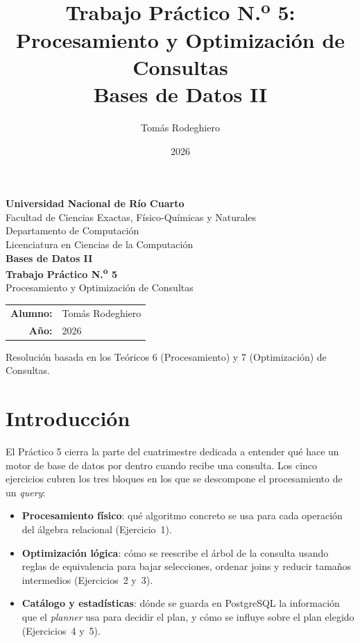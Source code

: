 \documentclass[11pt,a4paper]{article}
\title{Trabajo Práctico N.\textsuperscript{o} 5:
       Procesamiento y Optimización de Consultas\\[4pt]
       \large Bases de Datos II}
\author{Tomás Rodeghiero}
\date{2026}
\begin{document}
\begin{titlepage}
    \centering
    \vspace*{1.5cm}

    {\large \textbf{Universidad Nacional de Río Cuarto}}\\[6pt]
    {\normalsize Facultad de Ciencias Exactas, Físico-Químicas y Naturales}\\[4pt]
    {\normalsize Departamento de Computación}\\[4pt]
    {\normalsize Licenciatura en Ciencias de la Computación}\\[3cm]

    {\Large \textbf{Bases de Datos II}}\\[1.2cm]

    {\Large \textbf{Trabajo Práctico N.\textsuperscript{o} 5}}\\[6pt]
    {\large Procesamiento y Optimización de Consultas}\\[3cm]

    \begin{tabular}{rl}
        \textbf{Alumno:} & Tomás Rodeghiero \\[4pt]
        \textbf{Año:}    & 2026 \\
    \end{tabular}

    \vfill
    {\small Resolución basada en los Teóricos 6 (Procesamiento) y 7 (Optimización)
    de Consultas.}
\end{titlepage}

\tableofcontents
\newpage

\section{Introducción}

El Práctico 5 cierra la parte del cuatrimestre dedicada a entender qué hace un motor de base de datos por dentro cuando recibe una consulta. Los cinco ejercicios cubren los tres bloques en los que se descompone el procesamiento de un \emph{query}:

\begin{itemize}
    \item \textbf{Procesamiento físico}: qué algoritmo concreto se usa para cada operación del álgebra relacional (Ejercicio~1).
    \item \textbf{Optimización lógica}: cómo se reescribe el árbol de la consulta usando reglas de equivalencia para bajar selecciones, ordenar joins y reducir tamaños intermedios (Ejercicios~2 y~3).
    \item \textbf{Catálogo y estadísticas}: dónde se guarda en PostgreSQL la información que el \emph{planner} usa para decidir el plan, y cómo se influye sobre el plan elegido (Ejercicios~4 y~5).
\end{itemize}
\end{document}
